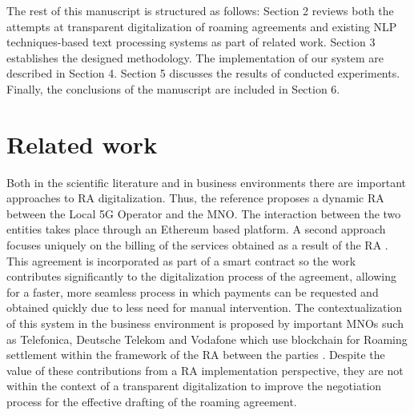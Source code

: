 \documentclass[conference]{style/IEEEtran}
\begin{document}
The rest of this manuscript is structured as follows: Section 2 reviews both the attempts at transparent digitalization of roaming agreements and existing NLP techniques-based text processing systems as part of related work. Section 3 establishes the designed methodology. The implementation of our system are described in Section 4. Section 5 discusses the results of conducted experiments. Finally, the conclusions of the manuscript are included in Section 6.

\section{Related work}

Both in the scientific literature and in business environments there are important approaches to RA digitalization. Thus, the reference \cite{9369516} proposes a dynamic RA between the Local 5G Operator and the MNO. The interaction between the two entities takes place through an Ethereum based platform. A second approach focuses uniquely on the billing of the services obtained as a result of the RA \cite{9024541}. This agreement is incorporated as part of a smart contract so the work contributes significantly to the digitalization process of the agreement, allowing for a faster, more seamless process in which payments can be requested and obtained quickly due to less need for manual intervention. The contextualization of this system in the business environment is proposed by important MNOs such as Telefonica, Deutsche Telekom and Vodafone which use blockchain for Roaming settlement within the framework of the RA between the parties \cite{Huillet2020}. Despite the value of these contributions from a RA implementation perspective, they are not within the context of a transparent digitalization to improve the negotiation process for the effective drafting of the roaming agreement. 
\end{document}
